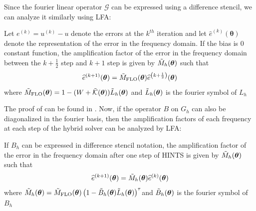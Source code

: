\documentclass[12pt]{article}
\begin{document}


Since the fourier linear operator $\mathcal{G}$ can be expressed using a difference stencil, we can analyze it similarly using LFA:
\begin{theorem} \label{th:lfaflo}
    Let $e^{(k)} = u^{(k)} - u$ denote the errors at the $k^{th}$ iteration and let $\widehat{e}^{(k)}(\boldsymbol{\theta})$ denote the representation of the error in the frequency domain. If the bias is $0$ constant function, the amplification factor of the error in the frequency domain between the $k + \frac{1}{2}$ step and $k + 1$ step is given by $\Tilde{M}_{h}(\boldsymbol{\theta})$ such that
    $$\widehat{e}^{(k + 1)}(\boldsymbol{\theta}) = \Tilde{M}_{\text{FLO}}(\boldsymbol{\theta})\widehat{e}^{\left(k + \frac{1}{2}\right)}(\boldsymbol{\theta})$$
    where $\Tilde{M}_{\text{FLO}}(\boldsymbol{\theta}) = 1 - (W + \Tilde{\mathcal{K}}(\boldsymbol{\theta}))\Tilde{L}_h(\boldsymbol{\theta})$ and $\Tilde{L}_h(\boldsymbol{\theta})$ is the fourier symbol of $L_h$
\end{theorem}
The proof of  can be found in . Now, if the operator $B$ on $G_h$ can also be diagonalized in the fourier basis, then the amplification factors of each frequency at each step of the hybrid solver can be analyzed by LFA:
\begin{corollary} \label{th:lfahybrid}
    If $B_h$ can be expressed in difference stencil notation, the amplification factor of the error in the frequency domain after one step of HINTS is given by $\Tilde{M}_{h}(\boldsymbol{\theta})$ such that
    $$\widehat{e}^{(k + 1)}(\boldsymbol{\theta}) = \Tilde{M}_{h}(\boldsymbol{\theta})\widehat{e}^{\left(k\right)}(\boldsymbol{\theta})$$
    where $\Tilde{M}_{h}(\boldsymbol{\theta}) = \Tilde{M}_{\text{FLO}}(\boldsymbol{\theta})\left(1 - \Tilde{B}_{h}(\boldsymbol{\theta})\Tilde{L}_h(\boldsymbol{\theta})\right)^{\tau}$and $\Tilde{B}_{h}(\boldsymbol{\theta})$ is the fourier symbol of $B_h$
\end{corollary}
\end{document}
